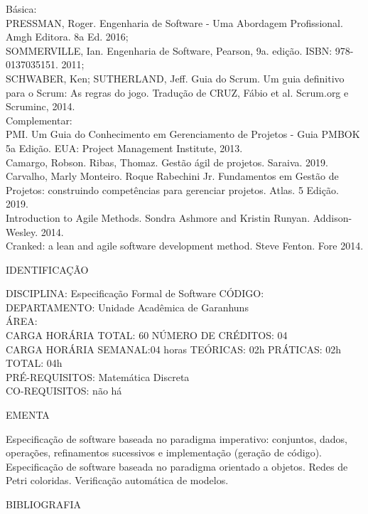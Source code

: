 \documentclass[
	12pt,				%
	openright,			%
  oneside,     %
	a4paper,			%
	english,			%
	french,				%
	spanish,			%
	brazil				%
	]{abntex2}
\begin{document}
\begin{apendicesenv}
Básica:\\
PRESSMAN, Roger. Engenharia de Software - Uma Abordagem Profissional. Amgh Editora. 8a Ed. 2016;\\
SOMMERVILLE, Ian. Engenharia de Software, Pearson, 9a. edição. ISBN: 978-0137035151. 2011;\\
SCHWABER, Ken; SUTHERLAND, Jeff. Guia do Scrum. Um guia definitivo para o Scrum: As regras do jogo. Tradução de CRUZ, Fábio et al. Scrum.org e Scruminc, 2014.\\
Complementar:\\
PMI. Um Guia do Conhecimento em Gerenciamento de Projetos - Guia PMBOK 5a Edição. EUA: Project Management Institute, 2013.\\
Camargo, Robson. Ribas, Thomaz. Gestão ágil de projetos. Saraiva. 2019.\\
Carvalho, Marly Monteiro. Roque Rabechini Jr. Fundamentos em Gestão de Projetos: construindo competências para gerenciar projetos. Atlas. 5 Edição. 2019.\\
Introduction to Agile Methods. Sondra Ashmore and Kristin Runyan. Addison-Wesley. 2014.\\
Cranked: a lean and agile software development method. Steve Fenton. Fore 2014.

\newpage IDENTIFICAÇÃO

DISCIPLINA: Especificação Formal de Software CÓDIGO: \\
DEPARTAMENTO: Unidade Acadêmica de Garanhuns\\
ÁREA: \\
CARGA HORÁRIA TOTAL: 60 NÚMERO DE CRÉDITOS: 04\\
CARGA HORÁRIA SEMANAL:04 horas TEÓRICAS: 02h PRÁTICAS: 02h TOTAL: 04h\\
PRÉ-REQUISITOS: Matemática Discreta\\
CO-REQUISITOS: não há

EMENTA 

Especificação de software baseada no paradigma imperativo: conjuntos, dados, operações, refinamentos sucessivos e implementação (geração de código). Especificação de software baseada no paradigma orientado a objetos. Redes de Petri coloridas. Verificação automática de modelos.

BIBLIOGRAFIA 


\end{apendicesenv}
\end{document}

